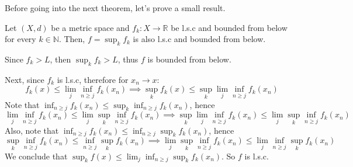 Before going into the next theorem, let's prove a small result.
\begin{lemma}
  Let $(X,d)$ be a metric space and $f_k: X \to \mathbb R$ be l.s.c and bounded from below for every $k \in \mathbb N$.
  Then, $f = \sup_k f_k$ is also l.s.c and bounded from below.
\end{lemma}

\begin{prf}
  Since $f_k > L$, then $\sup_k f_k > L$, thus $f$ is bounded from below.

  Next, since $f_k$ is l.s.c, therefore for $x_n \to x$:
  \begin{equation*}
  f_k(x) \leq \lim_{j} \inf_{n \geq j} f_k(x_n) \implies 
  \sup_k f_k(x) \leq \sup_k \lim_{j} \inf_{n \geq j} f_k(x_n)
  \end{equation*}
  Note that $\inf_{n\geq j} f_k(x_n) \leq \sup_k \inf_{n\geq j}f_k(x_n)$, hence
  \begin{equation*}
    \lim_j \inf_{n\geq j} f_k(x_n) \leq \lim_j \sup_k \inf_{n\geq j}f_k(x_n) \implies
    \sup_k \lim_j \inf_{n\geq j} f_k(x_n) \leq \lim_j \sup_k \inf_{n\geq j}f_k(x_n)
  \end{equation*}
  Also, note that $\inf_{n\geq j} f_k(x_n) \leq \inf_{n\geq j} \sup_k f_k(x_n)$, hence
  \begin{equation*}
    \sup_k \inf_{n \geq j} f_k(x_n) \leq
    \inf_{n \geq j} \sup_k f_k(x_n) \implies 
    \lim_j \sup_k \inf_{n \geq j} f_k(x_n) \leq
    \lim_j \inf_{n \geq j} \sup_k f_k(x_n)
  \end{equation*}
  We conclude that $\sup_k f(x) \leq \lim_j \inf_{n \geq j} \sup_k f_k(x_n)$. So $f$ is l.s.c.

\end{prf}

